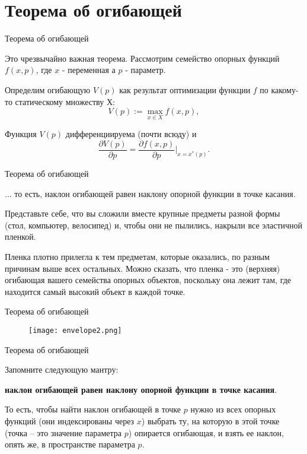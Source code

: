 \documentclass{beamer}
\begin{document}
\section{Теорема об огибающей}

\begin{frame}{Теорема об огибающей}

Это чрезвычайно важная теорема. Рассмотрим семейство опорных функций $f(x, p)$, где $x$ - переменная а $p$ - параметр. 

Определим огибающую $V(p)$ как результат оптимизации функции $f$ по какому-то статическому множеству $Х$: 
$$ V(p) := \max_{x \in X} f(x, p),$$

\begin{theorem}[Об огибающей]
Функция $V(p)$ дифференциируема (почти всюду) и 
$$\frac{\partial V(p)}{\partial p} = \frac{\partial f(x, p)}{\partial p}|_{x = x^{\ast}(p)}.$$
\end{theorem}

\end{frame}

\begin{frame}{Теорема об огибающей}

... то есть, наклон огибающей равен наклону опорной функции в точке касания.

Представьте себе, что вы сложили вместе крупные предметы разной формы (стол, компьютер, велосипед) и, чтобы они не пылились, накрыли все эластичной пленкой. 

Пленка плотно прилегла к тем предметам, которые оказались, по разным причинам выше всех остальных. Можно сказать, что пленка - это (верхняя) огибающая вашего семейства опорных объектов, поскольку она лежит там, где находится самый высокий объект в каждой точке.

\end{frame}

\begin{frame}{Теорема об огибающей}

\begin{figure}[hbt]
\centering
\texttt{[image: envelope2.png]}
\end{figure}

\end{frame}

\begin{frame}{Теорема об огибающей}

Запомните следующую мантру: 

\textbf{наклон огибающей равен наклону опорной функции в точке касания}. 

То есть, чтобы найти наклон огибающей в точке $p$ нужно из всех опорных функций (они индексированы через $x$) выбрать ту, на которую в этой точке (точка – это значение параметра $p$) опирается огибающая, и взять ее наклон, опять же, в пространстве параметра $p$. 

\end{frame}
\end{document}

